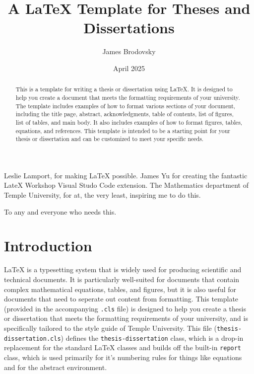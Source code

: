 \documentclass{thesis-dissertation}
\title{A \LaTeX{} Template for Theses and Dissertations}
\author{James Brodovsky}        %
\date{April 2025}               %
\begin{document}
\newtheorem{notation}{Notation}[chapter]
\newtheorem{rem}{Remark}[chapter]
\newtheorem{lem}{Lemma}[chapter]
\newtheorem{cor}{Corollary}[chapter]
\newtheorem{tem}{Theorem}[chapter]
\newtheorem{prop}{Proposition}[chapter]
\newtheorem{example}{Example}[chapter]
\newtheorem{define}{Definition}[chapter]

\maketitlepage{}

\begin{abstract}
  This is a template for writing a thesis or dissertation using \LaTeX{}. It is designed to help you create a document that meets the formatting requirements of your university. The template includes examples of how to format various sections of your document, including the title page, abstract, acknowledgments, table of contents, list of figures, list of tables, and main body. It also includes examples of how to format figures, tables, equations, and references. This template is intended to be a starting point for your thesis or dissertation and can be customized to meet your specific needs.
\end{abstract}

\begin{acknowledgments}
  Leslie Lamport, for making \LaTeX{} possible.
  James Yu for creating the fantastic LateX Workshop Visual Studo Code extension.
  The Mathematics department of Temple University, for at, the very least, inspiring me to do this.
\end{acknowledgments}

\begin{dedication}
  To any and everyone who needs this.
\end{dedication}

\singlespacing{}
\tableofcontents{}
\listoffigures{}
\listoftables{}

\newpage{}
\doublespacing{}

\chapter{Introduction}
\LaTeX{} is a typesetting system that is widely used for producing scientific and technical documents. It is particularly well-suited for documents that contain complex mathematical equations, tables, and figures, but it is also useful for documents that need to seperate out content from formatting. This template (provided in the accompanying \texttt{.cls} file) is designed to help you create a thesis or dissertation that meets the formatting requirements of your university, and is specifically tailored to the style guide of Temple University. This file (\texttt{thesis-dissertation.cls}) defines the \texttt{thesis-dissertation} class, which is a drop-in replacement for the standard \LaTeX{} classes and builds off the built-in \texttt{report} class, which is used primarily for it's numbering rules for things like equations and for the abstract environment.
\end{document}
